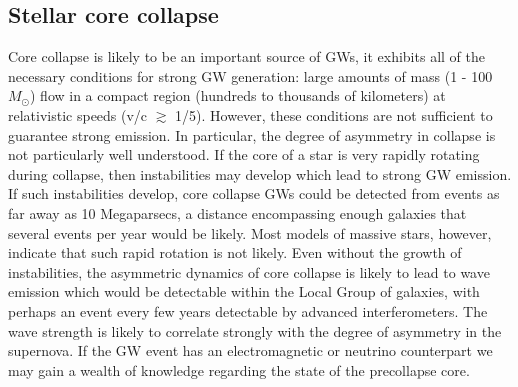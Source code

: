 \documentclass[binding=0.6cm, LaM]{sapthesis}
\begin{document}
\subsection{Stellar core collapse}
Core collapse is likely to be an important source of GWs, it exhibits all of the necessary conditions for strong GW generation: large amounts of mass (1 - 100 $M_{\odot}$) flow in a compact region
 (hundreds to thousands of kilometers) at relativistic speeds (v/c $\apprge$ 1/5). However, these conditions are not sufficient to guarantee strong emission. 
In particular, the degree of asymmetry in collapse is not particularly well understood.
If the core of a star is very rapidly rotating during collapse, then instabilities may develop which lead to strong GW emission.
If such instabilities develop, core collapse GWs could be detected from events as far away as 10 Megaparsecs, a distance encompassing enough galaxies that several events per year would be likely. 
Most models of massive stars, however, indicate that such rapid rotation is not likely.
Even without the growth of instabilities, the asymmetric dynamics of core collapse is likely to lead to wave emission which would be detectable within the Local Group of galaxies, with perhaps an 
event every few years detectable by advanced interferometers.
The wave strength is likely to correlate strongly with the degree of asymmetry in the supernova. 
If the GW event has an electromagnetic or neutrino counterpart we may gain a wealth of knowledge regarding the state of the precollapse core.
\end{document}
